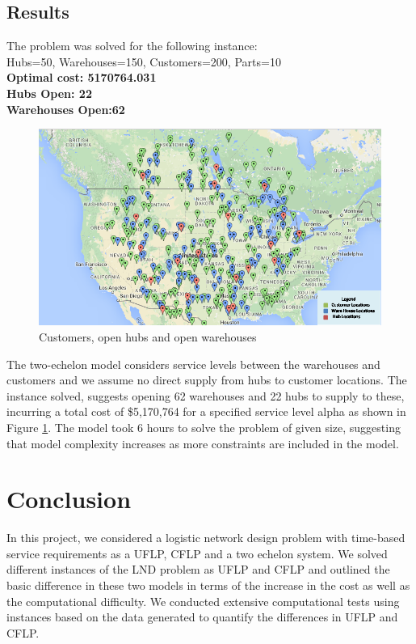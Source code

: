 \documentclass[12pt]{article}
\numberwithin{equation}{section}
\begin{document}
\subsection{Results}
The problem was solved for the following instance:\\
Hubs=50, Warehouses=150, Customers=200, Parts=10\\
\textbf{Optimal cost: 5170764.031\\
Hubs Open: 22\\
Warehouses Open:62}
\begin{figure}[H]
\centering
  \includegraphics[scale=0.63]{hubmap.png}
  \caption{Customers, open hubs and open warehouses}
  \label{fig:hubwh}
\end{figure}
The two-echelon model considers service levels between the warehouses and customers and we assume no direct supply from hubs to customer locations. The instance solved, suggests opening 62 warehouses and 22 hubs to supply to these, incurring a total cost of \$5,170,764 for a specified service level alpha as shown in Figure \ref{fig:hubwh}. The model took 6 hours to solve the problem of given size, suggesting that model complexity increases as more constraints are included in the model.
\section{Conclusion}
In this project, we considered a logistic network design problem with time-based service requirements as a UFLP, CFLP and a two echelon system. We solved different instances of the LND problem as UFLP and CFLP and outlined the basic difference in these two models in terms of the increase in the cost as well as the computational difficulty. We conducted extensive computational tests using instances based on the data generated to quantify the differences in UFLP and CFLP.\\
\end{document}
